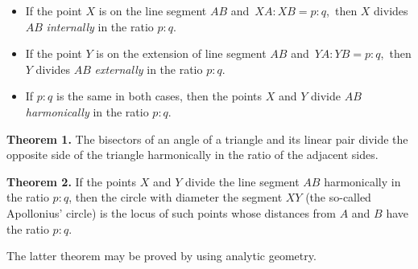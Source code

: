 \documentclass[12pt]{article}
\theoremstyle{definition}
\begin{document}
 
\begin{itemize}
\item If the point $X$ is on the line segment $AB$ and\, $XA\!:\!XB = p\!:\!q$,\, then $X$ divides $AB$ {\em internally} in the ratio $p\!:\!q$.
\item If the point $Y$ is on the extension of line segment $AB$ and\, $YA\!:\!YB = p\!:\!q$,\, then $Y$ divides $AB$ {\em externally} in the ratio $p\!:\!q$.
\item If $p\!:\!q$ is the same in both cases, then the points $X$ and $Y$ divide $AB$ {\em harmonically} in the ratio $p\!:\!q$.
\end{itemize}

\textbf{Theorem 1.}  The bisectors of an angle of a triangle and its linear pair divide the opposite side of the triangle harmonically in the ratio of the adjacent sides.

\textbf{Theorem 2.}  If the points $X$ and $Y$ divide the line segment $AB$ harmonically in the ratio $p\!:\!q$, then the circle with diameter the segment $XY$ (the so-called Apollonius' circle) is the locus of such points whose distances from $A$ and $B$ have the ratio $p\!:\!q$.

The latter theorem may be proved by using analytic geometry.

\end{document}
